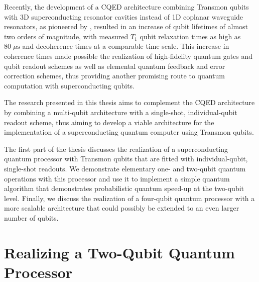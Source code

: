 Recently, the development of a CQED architecture combining Transmon qubits with 3D superconducting resonator cavities instead of 1D coplanar waveguide resonators, as pioneered by \cite{paik_observation_2011}, resulted in an increase of qubit lifetimes of almost two orders of magnitude, with measured $T_1$ qubit relaxation times as high as $80 \; \mu \mathrm{s}$ and decoherence times at a comparable time scale. This increase in coherence times made possible the realization of high-fidelity quantum gates and qubit readout schemes  as well as elemental quantum feedback and error correction schemes, thus providing another promising route to quantum computation with superconducting qubits.

The research presented in this thesis aims to complement the CQED architecture by combining a multi-qubit architecture with a single-shot, individual-qubit readout scheme, thus aiming to develop a viable architecture for the implementation of a superconducting quantum computer using Transmon qubits. 

The first part of the thesis discusses the realization of a superconducting quantum processor with Transmon qubits that are fitted with individual-qubit, single-shot readouts. We demonstrate elementary one- and two-qubit quantum operations with this processor and use it to implement a simple quantum algorithm that demonstrates probabilistic quantum speed-up at the two-qubit level. Finally, we discuss the realization of a four-qubit quantum processor with a more scalable architecture that could possibly be extended to an even larger number of qubits.

\section{Realizing a Two-Qubit Quantum Processor}

